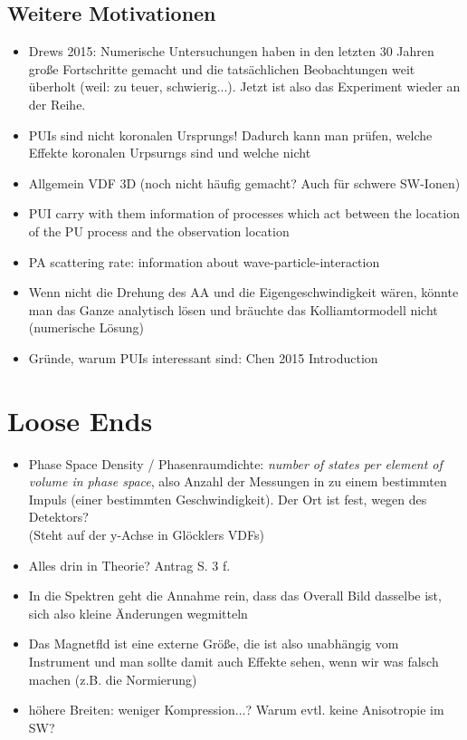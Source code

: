 \documentclass[]{article}
\begin{document}
\subsection{Weitere Motivationen}
\begin{itemize}
	\item Drews 2015: Numerische Untersuchungen haben in den letzten 30 Jahren große Fortschritte gemacht und die tatsächlichen Beobachtungen weit überholt (weil: zu teuer, schwierig...). Jetzt ist also das Experiment wieder an der Reihe. 
	\item PUIs sind nicht koronalen Ursprungs! Dadurch kann man prüfen, welche Effekte koronalen Urpsurngs sind und welche nicht
	\item Allgemein VDF 3D (noch nicht häufig gemacht? Auch für schwere SW-Ionen)
	\item PUI carry with them information of processes which act between the location of the PU process and the observation location
	\item PA scattering rate: information about wave-particle-interaction 
	\item Wenn nicht die Drehung des AA und die Eigengeschwindigkeit wären, könnte man das Ganze analytisch lösen und bräuchte das Kolliamtormodell nicht (numerische Lösung)
	\item Gründe, warum PUIs interessant sind: Chen 2015 Introduction
\end{itemize}
%
%
%
\newpage
\section{Loose Ends}
\begin{itemize}
	\item Phase Space Density / Phasenraumdichte: \textit{number of states per element of volume in phase space}, also Anzahl der Messungen in zu einem bestimmten Impuls (einer bestimmten Geschwindigkeit). Der Ort ist fest, wegen des Detektors?\\
	(Steht auf der y-Achse in Glöcklers VDFs)
	\item Alles drin in Theorie? Antrag S. 3 f.
	\item In die Spektren geht die Annahme rein, dass das Overall Bild dasselbe ist, sich also kleine Änderungen wegmitteln
	\item Das Magnetfld ist eine externe Größe, die ist also unabhängig vom Instrument und man sollte damit auch Effekte sehen, wenn wir was falsch machen (z.B. die Normierung)
	\item höhere Breiten: weniger Kompression...? Warum evtl. keine Anisotropie im SW?
\end{itemize}
%
%
%
\newpage
\end{document}

